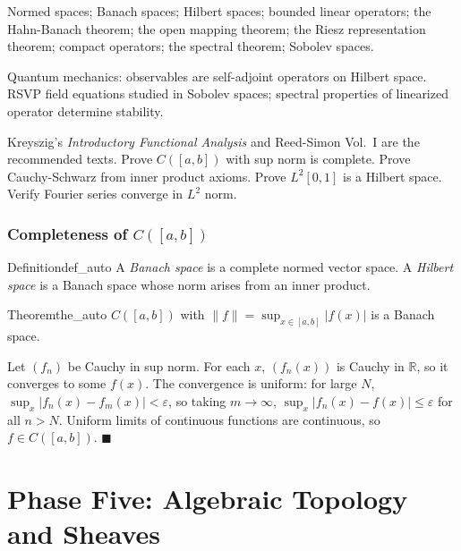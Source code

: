 \documentclass[12pt, twoside, openright, a4paper]{book}
\renewenvironment{proof}{%
  \par\medskip\noindent{\color{RSVPgreen}\bfseries\sffamily Proof.}\enspace\ignorespaces
}{\hfill{\color{RSVPgreen}$\blacksquare$}\par\medskip}
\newcommand{\R}{\mathbb{R}}
\begin{document}
\begin{structures}
Normed spaces; Banach spaces; Hilbert spaces; bounded linear operators; the Hahn-Banach theorem; the open mapping theorem; the Riesz representation theorem; compact operators; the spectral theorem; Sobolev spaces.
\end{structures}

\begin{dependencies}
Quantum mechanics: observables are self-adjoint operators on Hilbert space.
RSVP field equations studied in Sobolev spaces; spectral properties of linearized operator determine stability.
\end{dependencies}

\begin{exercises_box}
Kreyszig's \textit{Introductory Functional Analysis} and Reed-Simon Vol.\ I are the recommended texts.
Prove $C([a,b])$ with sup norm is complete.
Prove Cauchy-Schwarz from inner product axioms.
Prove $L^2[0,1]$ is a Hilbert space.
Verify Fourier series converge in $L^2$ norm.
\end{exercises_box}

\section{Completeness of $C([a,b])$}

\begin{definition}{Definition}{def_auto}
A \emph{Banach space} is a complete normed vector space.
A \emph{Hilbert space} is a Banach space whose norm arises from an inner product.
\end{definition}

\begin{theorem}{Theorem}{the_auto}
$C([a,b])$ with $\|f\| = \sup_{x\in[a,b]}|f(x)|$ is a Banach space.
\end{theorem}
\begin{proof}
Let $(f_n)$ be Cauchy in sup norm.
For each $x$, $(f_n(x))$ is Cauchy in $\R$, so it converges to some $f(x)$.
The convergence is uniform: for large $N$, $\sup_x |f_n(x) - f_m(x)| < \varepsilon$, so taking $m \to \infty$, $\sup_x |f_n(x) - f(x)| \leq \varepsilon$ for all $n > N$.
Uniform limits of continuous functions are continuous, so $f \in C([a,b])$.
\end{proof}

\part{Phase Five: Algebraic Topology and Sheaves}
\end{document}
